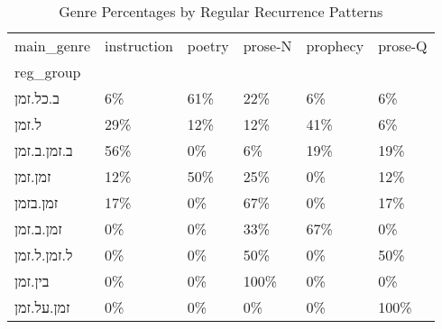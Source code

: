 \begin{table}[htbp!]
\centering
\caption{Genre Percentages by Regular Recurrence Patterns}
\label{table:regroup_gen_pc}
\begin{tabular}{llllll}
\toprule
main\_genre & instruction & poetry & prose-N & prophecy & prose-Q \\
reg\_group   &             &        &         &          &         \\
\midrule
ב.כל.זמן    &          6\% &    61\% &     22\% &       6\% &      6\% \\
ל.זמן       &         29\% &    12\% &     12\% &      41\% &      6\% \\
ב.זמן.ב.זמן &         56\% &     0\% &      6\% &      19\% &     19\% \\
זמן.זמן     &         12\% &    50\% &     25\% &       0\% &     12\% \\
זמן.בזמן    &         17\% &     0\% &     67\% &       0\% &     17\% \\
זמן.ב.זמן   &          0\% &     0\% &     33\% &      67\% &      0\% \\
ל.זמן.ל.זמן &          0\% &     0\% &     50\% &       0\% &     50\% \\
בין.זמן     &          0\% &     0\% &    100\% &       0\% &      0\% \\
זמן.על.זמן  &          0\% &     0\% &      0\% &       0\% &    100\% \\
\bottomrule
\end{tabular}
\end{table}

